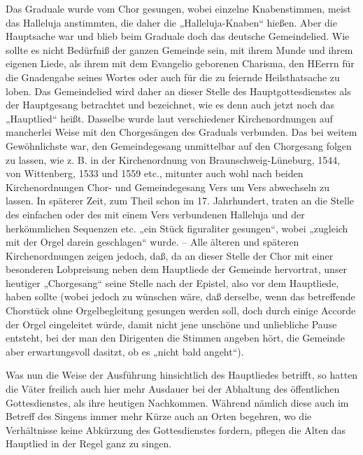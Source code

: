 Das Graduale wurde vom Chor gesungen, wobei einzelne Knabenstimmen, meist das Halleluja anstimmten, die daher die „Halleluja-Knaben“ hießen. Aber die Hauptsache war und blieb beim Graduale doch das deutsche Gemeindelied. Wie sollte es nicht Bedürfniß der ganzen Gemeinde sein, mit ihrem Munde und ihrem eigenen Liede, als ihrem mit dem Evangelio geborenen Charisma, den HEerrn für die Gnadengabe seines Wortes oder auch für die zu feiernde Heilsthatsache zu loben. Das Gemeindelied wird daher an dieser Stelle des Hauptgottesdienstes als der Hauptgesang betrachtet und bezeichnet, wie es denn auch jetzt noch das „Hauptlied“ heißt. Dasselbe wurde laut verschiedener Kirchenordnungen auf mancherlei Weise mit den Chorgesängen des Graduals verbunden. Das bei weitem Gewöhnlichste war, den Gemeindegesang
unmittelbar auf den Chorgesang folgen zu lassen, wie z. B. in der Kirchenordnung von Braunschweig-Lüneburg, 1544, von Wittenberg, 1533 und 1559 etc., mitunter auch wohl nach beiden Kirchenordnungen Chor- und Gemeindegesang Vers um Vers abwechseln zu lassen. In späterer Zeit, zum Theil schon im 17. Jahrhundert, traten an die Stelle des einfachen oder des mit einem Vers verbundenen Halleluja und der herkömmlichen Sequenzen etc. „ein Stück figuraliter gesungen“, wobei „zugleich mit der Orgel darein geschlagen“ wurde. -- Alle älteren und späteren Kirchenordnungen zeigen jedoch, daß, da an dieser Stelle der Chor mit einer besonderen Lobpreisung neben dem Hauptliede der Gemeinde hervortrat, unser heutiger „Chorgesang“ seine Stelle nach der Epistel, also vor dem Hauptliede, haben sollte (wobei jedoch zu wünschen wäre, daß derselbe, wenn das betreffende Chorstück ohne Orgelbegleitung gesungen werden soll, doch durch einige Accorde der Orgel eingeleitet würde, damit nicht jene unschöne und unliebliche Pause entsteht, bei der man den Dirigenten die Stimmen angeben hört, die Gemeinde aber erwartungsvoll dasitzt, ob es „nicht bald angeht“).

Was nun die Weise der Ausführung hinsichtlich des Hauptliedes betrifft, so hatten die Väter freilich auch hier mehr Ausdauer bei der Abhaltung des öffentlichen Gottesdienstes, als ihre heutigen Nachkommen. Während nämlich diese auch im Betreff des Singens immer mehr Kürze auch an Orten begehren, wo die Verhältnisse keine Abkürzung des Gottesdienstes fordern, pflegen die Alten das Hauptlied in der Regel ganz zu singen.

